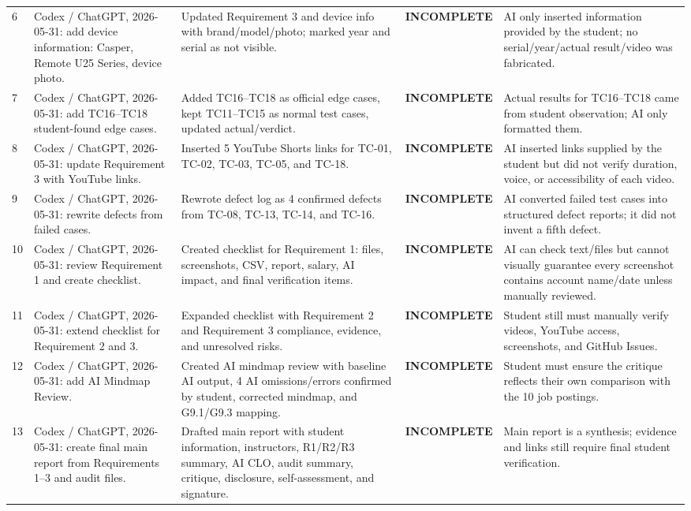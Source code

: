 \documentclass[12pt, a4paper]{article}
\newcommand{\incompl}{\textcolor{WarnOrange}{\textbf{INCOMPLETE}}}
\begin{document}
{\begin{longtable}{@{} C{0.6cm} L{2.8cm} L{3.1cm} C{2.7cm} L{4.8cm} @{}}
6 & Codex / ChatGPT, 2026-05-31: add device information: Casper, Remote U25 Series, device photo. & Updated Requirement 3 and device info with brand/model/photo; marked year and serial as not visible. & \incompl{} & AI only inserted information provided by the student; no serial/year/actual result/video was fabricated. \\[3pt]
7 & Codex / ChatGPT, 2026-05-31: add TC16--TC18 student-found edge cases. & Added TC16--TC18 as official edge cases, kept TC11--TC15 as normal test cases, updated actual/verdict. & \incompl{} & Actual results for TC16--TC18 came from student observation; AI only formatted them. \\[3pt]
8 & Codex / ChatGPT, 2026-05-31: update Requirement 3 with YouTube links. & Inserted 5 YouTube Shorts links for TC-01, TC-02, TC-03, TC-05, and TC-18. & \incompl{} & AI inserted links supplied by the student but did not verify duration, voice, or accessibility of each video. \\[3pt]
9 & Codex / ChatGPT, 2026-05-31: rewrite defects from failed cases. & Rewrote defect log as 4 confirmed defects from TC-08, TC-13, TC-14, and TC-16. & \incompl{} & AI converted failed test cases into structured defect reports; it did not invent a fifth defect. \\[3pt]
10 & Codex / ChatGPT, 2026-05-31: review Requirement 1 and create checklist. & Created checklist for Requirement 1: files, screenshots, CSV, report, salary, AI impact, and final verification items. & \incompl{} & AI can check text/files but cannot visually guarantee every screenshot contains account name/date unless manually reviewed. \\[3pt]
11 & Codex / ChatGPT, 2026-05-31: extend checklist for Requirement 2 and 3. & Expanded checklist with Requirement 2 and Requirement 3 compliance, evidence, and unresolved risks. & \incompl{} & Student still must manually verify videos, YouTube access, screenshots, and GitHub Issues. \\[3pt]
12 & Codex / ChatGPT, 2026-05-31: add AI Mindmap Review. & Created AI mindmap review with baseline AI output, 4 AI omissions/errors confirmed by student, corrected mindmap, and G9.1/G9.3 mapping. & \incompl{} & Student must ensure the critique reflects their own comparison with the 10 job postings. \\[3pt]
13 & Codex / ChatGPT, 2026-05-31: create final main report from Requirements 1--3 and audit files. & Drafted main report with student information, instructors, R1/R2/R3 summary, AI CLO, audit summary, critique, disclosure, self-assessment, and signature. & \incompl{} & Main report is a synthesis; evidence and links still require final student verification. \\[3pt]

\end{longtable}}
\end{document}
